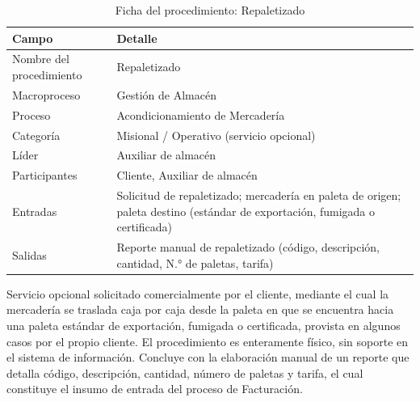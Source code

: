 \documentclass[11pt, a4paper, oneside]{report}
\begin{document}
\begin{table}[H]
\centering\small
\renewcommand{\arraystretch}{1.25}
\setlength{\tabcolsep}{6pt}
\begin{tabularx}{\textwidth}{|>{\raggedright\arraybackslash}p{}|>{\raggedright\arraybackslash}X|}
\hline
\rowcolor{upeu_mid}
\color{white}\bfseries Campo & \color{white}\bfseries Detalle \\ \hline
\rowcolor{gray!10}
Nombre del procedimiento & Repaletizado \\ \hline
\rowcolor{gray!10}
Macroproceso & Gestión de Almacén \\ \hline
Proceso & Acondicionamiento de Mercadería \\ \hline
\rowcolor{gray!10}
Categoría & Misional / Operativo (servicio opcional) \\ \hline
Líder & Auxiliar de almacén \\ \hline
\rowcolor{gray!10}
Participantes & Cliente, Auxiliar de almacén \\ \hline
Entradas & Solicitud de repaletizado; mercadería en paleta de origen; paleta destino (estándar de exportación, fumigada o certificada) \\ \hline
\rowcolor{gray!10}
Salidas & Reporte manual de repaletizado (código, descripción, cantidad, N.° de paletas, tarifa) \\ \hline
\end{tabularx}
\caption{Ficha del procedimiento: Repaletizado}
\end{table}

Servicio opcional solicitado comercialmente por el cliente, mediante el cual la mercadería se traslada caja por caja desde la paleta en que se encuentra hacia una paleta estándar de exportación, fumigada o certificada, provista en algunos casos por el propio cliente. El procedimiento es enteramente físico, sin soporte en el sistema de información. Concluye con la elaboración manual de un reporte que detalla código, descripción, cantidad, número de paletas y tarifa, el cual constituye el insumo de entrada del proceso de Facturación.
\end{document}
